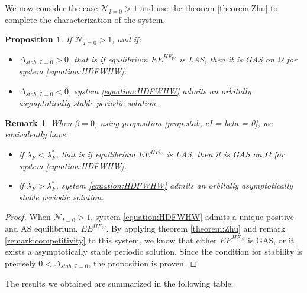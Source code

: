 \documentclass{article}
\newcommand{\lfw}{\lambda_{F}}
\newcommand{\lfw}{\lambda_{F}}
\newcommand{\cI}{\mathcal{I}}
\newtheorem{prop}{Proposition}
\newtheorem{remark}{Remark}
\begin{document}
We now consider the case $\mathcal{N}_{I = 0} > 1$ and use the theorem \ref{theorem:Zhu} to complete the characterization of the system.

\begin{prop}\label{prop:limitCycle, cI=0}
If $\mathcal{N}_{I =0} > 1$, and if:
\begin{itemize}
\item $\Delta_{stab, \cI =0} > 0$, that is if equilibrium $EE^{HF_W}$ is LAS, then it is GAS on $\Omega$ for system \eqref{equation:HDFWHW}.
\item $\Delta_{stab, \cI =0} < 0$, system \eqref{equation:HDFWHW} admits an orbitally asymptotically stable periodic solution.
\end{itemize}
\end{prop}

\begin{remark}
When $\beta = 0$, using proposition \ref{prop:stab, cI = beta = 0}, we equivalently have:
\begin{itemize}
\item if $\lfw <  \lfw^*$, that is if equilibrium $EE^{HF_W}$ is LAS, then it is GAS on $\Omega$ for system \eqref{equation:HDFWHW}.
\item if $\lfw  > \lfw^*$, system \eqref{equation:HDFWHW} admits an orbitally asymptotically stable periodic solution.
\end{itemize}
\end{remark}

\begin{proof}
When $\mathcal{N}_{I =0} > 1$, system \eqref{equation:HDFWHW} admits a unique positive and AS equilibrium, $EE^{HF_W}$. By applying theorem \ref{theorem:Zhu} and remark \ref{remark:competitivity} to this system, we know that either $EE^{HF_W}$ is GAS, or it exists a asymptotically stable periodic solution. Since the condition for stability is precisely $0 < \Delta_{stab, \cI =0}$, the proposition is proven. 
\end{proof}

The results we obtained are summarized in the following table:
%
\end{document}

